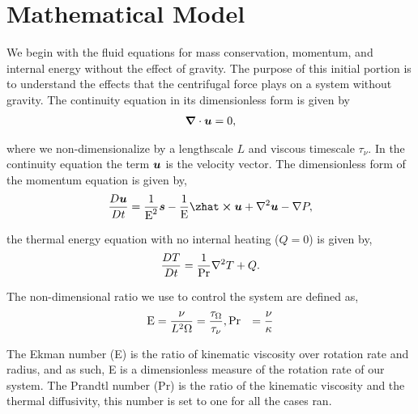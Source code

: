 \section{Mathematical Model}

We begin with the fluid equations for mass conservation, momentum, and internal energy without the effect of gravity. The purpose of this initial portion is to understand the effects that the centrifugal force plays on a system without gravity. The continuity equation in its dimensionless form is given by
\begin{align}
	\boldsymbol{\nabla} \cdot \boldsymbol{u} = 0,
\end{align}

where we non-dimensionalize by a lengthscale $L$ and viscous timescale $\tau_{\nu}$. In the continuity equation the term $\boldsymbol{u}$ is the velocity vector. The dimensionless form of the momentum equation is given by,
\begin{align}
	\frac{D \uvec}{D t} = \frac{1}{\ekman^2} \svec - \frac{1}{\ekman} \zhat \cross \uvec + \nabla^2 \uvec - \nabla P,
\end{align}

the thermal energy equation with no internal heating ($Q=0$) is given by, 
\begin{align}
	\frac{D T}{D t} = \frac{1}{\text{Pr}} \nabla^2 T + Q.
\end{align}

The non-dimensional ratio we use to control the system are defined as, 
\begin{align}
	\text{E} &= \frac{\nu}{L^2 \Omega} = \frac{\tau_{\Omega}}{\tau_{\nu}},
	\text{Pr} &= \frac{\nu}{\kappa}
\end{align}

The Ekman number (E) is the ratio of kinematic viscosity over rotation rate and radius, and as such, E is a dimensionless measure of the rotation rate of our system. The Prandtl number (Pr) is the ratio of the kinematic viscosity and the thermal diffusivity, this number is set to one for all the cases ran. 
